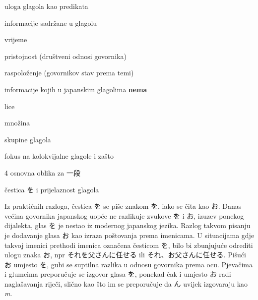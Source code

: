 
\author{Tomislav Mamić}

	
	
	\vspace{-10pt}
	\begin{hyou}
		\item uloga glagola kao predikata
		\item informacije sadržane u glagolu
		\vspace{-5pt}
		\begin{hyou}
			\item vrijeme
			\item pristojnost (društveni odnosi govornika)
			\item raspoloženje (govornikov stav prema temi)
		\end{hyou}
		\vspace{-10pt}
		\item informacije kojih u japanskim glagolima \textbf{nema}
		\vspace{-5pt}
		\begin{hyou}
			\item lice
			\item množina
		\end{hyou}
		\vspace{-10pt}
		\item skupine glagola
		\item fokus na kolokvijalne glagole i zašto
		\item 4 osnovna oblika za 一段
		\item čestica を i prijelaznost glagola
	\end{hyou}


	Iz praktičnih razloga, čestica を se piše znakom を, iako se čita kao お. Danas većina govornika japanskog uopće ne razlikuje zvukove を i お, izuzev ponekog dijalekta, glas を je nestao iz modernog japanskog jezika. Razlog takvom pisanju je dodavanje glasa お kao izraza poštovanja prema imenicama. U situacijama gdje takvoj imenici prethodi imenica označena česticom を, bilo bi zbunjujuće odrediti ulogu znaka お, npr それを父さんに任せる ili それ、お父さんに任せる. Pišući お umjesto を, gubi se suptilna razlika u odnosu govornika prema ocu. Pjevačima i glumcima preporučuje se izgovor glasa を, ponekad čak i umjesto お radi naglašavanja riječi, slično kao što im se preporučuje da ん uvijek izgovaraju kao \textit{m}.
	
